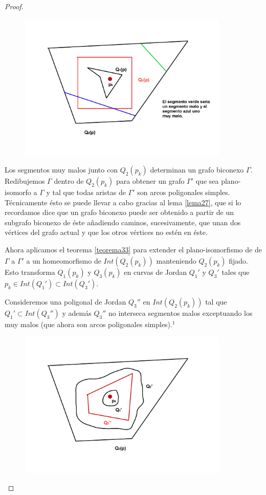 \begin{proof}
\begin{figure}[h]
\centering
\begin{minipage}[c]{\textwidth}
\centering
    \includegraphics[width=10.0cm]{images/pic3.jpg}
\end{minipage}
\end{figure}

	Los segmentos muy malos junto con $Q_{2}(p_k)$ determinan un grafo biconexo $\Gamma$. Redibujemos $\Gamma$ dentro de $Q_{2}(p_k)$  para obtener un grafo $\Gamma'$ que sea plano-isomorfo a $\Gamma$ y tal que todas aristas de $\Gamma'$ son arcos poligonales simples. Técnicamente ésto se puede llevar a cabo gracias al lema \ref{lema27}, que si lo recordamos dice que un grafo biconexo puede ser obtenido a partir de un subgrafo biconexo de éste añadiendo caminos, sucesivamente, que unan dos vértices del grafo actual y que los otros vértices no estén en éste.

	Ahora aplicamos el teorema \ref{teorema33} para extender el plano-isomorfismo de de $\Gamma$ a $\Gamma'$ a un homeomorfismo de $\overline{Int(Q_{2}(p_k))}$ manteniendo $Q_{2}(p_k)$ fijado. Esto transforma $Q_{1}(p_k)$ y $Q_{3}(p_k)$ en curvas de Jordan $Q_{1}'$ y $Q_{3}'$ tales que $p_{k} \in Int(Q_{1}') \subset Int(Q_{3}')$.

	Consideremos una poligonal de Jordan $Q_{3}''$ en $Int(Q_{2}(p_k))$ tal que $Q_{1}' \subset Int(Q_{3}'')$ y además $Q_{3}''$ no interseca segmentos malos exceptuando los muy malos (que ahora son arcos poligonales simples).$^{1}$
	
\begin{figure}[h]
\centering
\begin{minipage}[c]{\textwidth}
\centering
    \includegraphics[width=10.0cm]{images/pic4.jpg}
\end{minipage}
\end{figure}
	

\end{proof}
